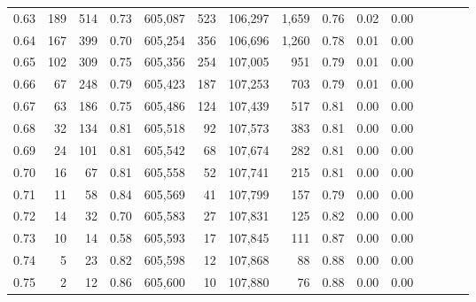 \begin{tabular}{rrrcrrrrrrrrrrr}
0.63 &     189 &    514 &                                       0.73 &  605,087 &      523 &  106,297 &    1,659 &  0.76 &  0.02 &                         0.00 \\
0.64 &     167 &    399 &                                       0.70 &  605,254 &      356 &  106,696 &    1,260 &  0.78 &  0.01 &                         0.00 \\
0.65 &     102 &    309 &                                       0.75 &  605,356 &      254 &  107,005 &      951 &  0.79 &  0.01 &                         0.00 \\
0.66 &      67 &    248 &                                       0.79 &  605,423 &      187 &  107,253 &      703 &  0.79 &  0.01 &                         0.00 \\
0.67 &      63 &    186 &                                       0.75 &  605,486 &      124 &  107,439 &      517 &  0.81 &  0.00 &                         0.00 \\
0.68 &      32 &    134 &                                       0.81 &  605,518 &       92 &  107,573 &      383 &  0.81 &  0.00 &                         0.00 \\
0.69 &      24 &    101 &                                       0.81 &  605,542 &       68 &  107,674 &      282 &  0.81 &  0.00 &                         0.00 \\
0.70 &      16 &     67 &                                       0.81 &  605,558 &       52 &  107,741 &      215 &  0.81 &  0.00 &                         0.00 \\
0.71 &      11 &     58 &                                       0.84 &  605,569 &       41 &  107,799 &      157 &  0.79 &  0.00 &                         0.00 \\
0.72 &      14 &     32 &                                       0.70 &  605,583 &       27 &  107,831 &      125 &  0.82 &  0.00 &                         0.00 \\
0.73 &      10 &     14 &                                       0.58 &  605,593 &       17 &  107,845 &      111 &  0.87 &  0.00 &                         0.00 \\
0.74 &       5 &     23 &                                       0.82 &  605,598 &       12 &  107,868 &       88 &  0.88 &  0.00 &                         0.00 \\
0.75 &       2 &     12 &                                       0.86 &  605,600 &       10 &  107,880 &       76 &  0.88 &  0.00 &                         0.00 \\

\end{tabular}
